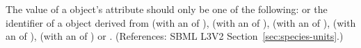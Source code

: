 The value of a \Species object's  attribute should
only be one of the following:  or the
identifier of a \UnitDefinition object derived from  (with an
 of ),  (with an  of
),  (with an  of ), 
(with an  of ),  (with an
 of ) or .  (References: SBML
L3V2 Section~\ref{sec:species-units}.)

